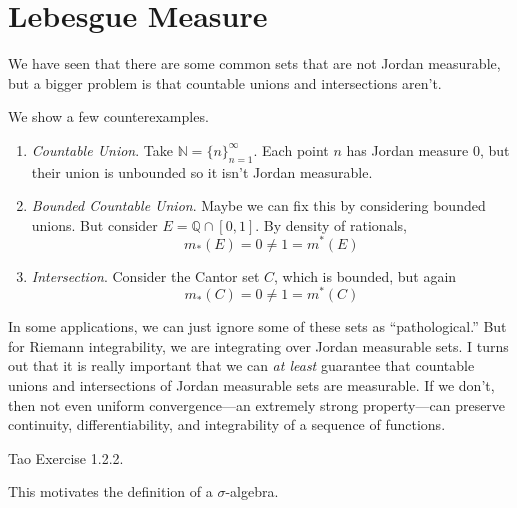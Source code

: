 \section{Lebesgue Measure} 

  We have seen that there are some common sets that are not Jordan measurable, but a bigger problem is that countable unions and intersections aren't. 

  \begin{example}
    We show a few counterexamples. 
    \begin{enumerate}
      \item \textit{Countable Union}. Take $\mathbb{N} = \{n\}_{n=1}^\infty$. Each point $n$ has Jordan measure $0$, but their union is unbounded so it isn't Jordan measurable. 

      \item \textit{Bounded Countable Union}. Maybe we can fix this by considering bounded unions. But consider $E = \mathbb{Q} \cap [0, 1]$. By density of rationals, 
      \begin{equation}
        m_\ast (E) = 0 \neq 1 = m^\ast (E)
      \end{equation}
        
      \item \textit{Intersection}. Consider the Cantor set $C$, which is bounded, but again 
      \begin{equation}
        m_\ast (C) = 0 \neq 1 = m^\ast (C)
      \end{equation}
    \end{enumerate}
  \end{example}

  In some applications, we can just ignore some of these sets as ``pathological.'' But for Riemann integrability, we are integrating over Jordan measurable sets. I turns out that it is really important that we can \textit{at least} guarantee that countable unions and intersections of Jordan measurable sets are measurable. If we don't, then not even uniform convergence---an extremely strong property---can preserve continuity, differentiability, and integrability of a sequence of functions. 

  \begin{example}
    Tao Exercise 1.2.2. 
  \end{example}

  This motivates the definition of a $\sigma$-algebra. 

